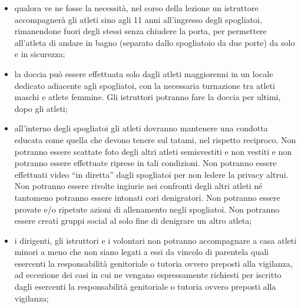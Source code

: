 \documentclass{djtsasddoc}
\begin{document}
\begin{enumerate}
\begin{enumerate}
\begin{itemize}
				\item qualora ve ne fosse la necessità, nel corso della lezione un istruttore accompagnerà gli atleti sino agli 11 anni all'ingresso degli spogliatoi, rimanendone fuori degli stessi senza chiudere la porta, per permettere all'atleta di andare in bagno (separato dallo spogliatoio da due porte) da solo e in sicurezza;
				\item la doccia può essere effettuata solo dagli atleti maggiorenni in un locale dedicato adiacente agli spogliatoi, con la necessaria turnazione tra atleti maschi e atlete femmine. Gli istruttori potranno fare la doccia per ultimi, dopo gli atleti;
				\item all'interno degli spogliatoi gli atleti dovranno mantenere una condotta educata come quella che devono tenere sul tatami, nel rispetto reciproco. Non potranno essere scattate foto degli altri atleti semisvestiti e non vestiti e non potranno essere effettuate riprese in tali condizioni. Non potranno essere effettuati video “in diretta” dagli spogliatoi per non ledere la privacy altrui. Non potranno essere rivolte ingiurie nei confronti degli altri atleti né tantomeno potranno essere intonati cori denigratori. Non potranno essere provate e/o ripetute azioni di allenamento negli spogliatoi. Non potranno essere creati gruppi social al solo fine di denigrare un altro atleta;
				\item i dirigenti, gli istruttori e i volontari non potranno accompagnare a casa atleti minori a meno che non siano legati a essi da vincolo di parentela quali esercenti la responsabilità genitoriale o tutoria ovvero preposti alla vigilanza, ad eccezione dei casi in cui ne vengano espressamente richiesti per iscritto dagli esercenti la responsabilità genitoriale o tutoria ovvero preposti alla vigilanza;

\end{itemize}
\end{enumerate}
\end{enumerate}
\end{document}
